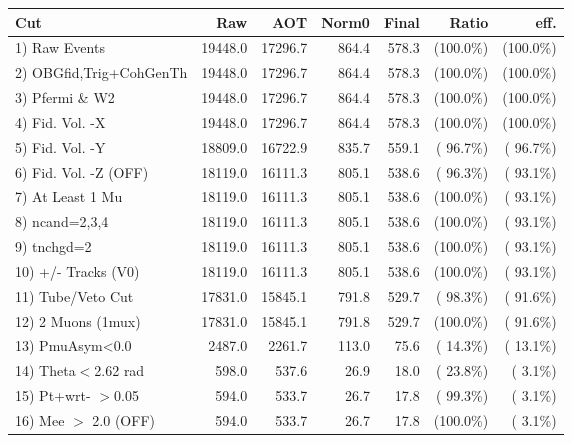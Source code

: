  \begin{table}[h!]\centering
 \begin{tabular}{||l||r|r|r|r|r|r||}
 \hline
 \hline
 Cut & Raw & AOT & Norm0 & Final & Ratio & eff.       \\
 \hline
  1) Raw Events           &      19448.0 &      17296.7 &        864.4 &        578.3 & (100.0\%) & (100.0\%) \\
  2) OBGfid,Trig+CohGenTh &      19448.0 &      17296.7 &        864.4 &        578.3 & (100.0\%) & (100.0\%) \\
  3) Pfermi \& W2         &      19448.0 &      17296.7 &        864.4 &        578.3 & (100.0\%) & (100.0\%) \\
  4) Fid. Vol. -X         &      19448.0 &      17296.7 &        864.4 &        578.3 & (100.0\%) & (100.0\%) \\
  5) Fid. Vol. -Y         &      18809.0 &      16722.9 &        835.7 &        559.1 & ( 96.7\%) & ( 96.7\%) \\
  6) Fid. Vol. -Z (OFF)   &      18119.0 &      16111.3 &        805.1 &        538.6 & ( 96.3\%) & ( 93.1\%) \\
  7) At Least 1 Mu        &      18119.0 &      16111.3 &        805.1 &        538.6 & (100.0\%) & ( 93.1\%) \\
  8) ncand=2,3,4          &      18119.0 &      16111.3 &        805.1 &        538.6 & (100.0\%) & ( 93.1\%) \\
  9) tnchgd=2             &      18119.0 &      16111.3 &        805.1 &        538.6 & (100.0\%) & ( 93.1\%) \\
 10) +/- Tracks (V0)      &      18119.0 &      16111.3 &        805.1 &        538.6 & (100.0\%) & ( 93.1\%) \\
 11) Tube/Veto Cut        &      17831.0 &      15845.1 &        791.8 &        529.7 & ( 98.3\%) & ( 91.6\%) \\
 12) 2 Muons (1mux)       &      17831.0 &      15845.1 &        791.8 &        529.7 & (100.0\%) & ( 91.6\%) \\
 13) PmuAsym<0.0          &       2487.0 &       2261.7 &        113.0 &         75.6 & ( 14.3\%) & ( 13.1\%) \\
 14) Theta$<$2.62 rad     &        598.0 &        537.6 &         26.9 &         18.0 & ( 23.8\%) & (  3.1\%) \\
 15) Pt+wrt- $>$0.05      &        594.0 &        533.7 &         26.7 &         17.8 & ( 99.3\%) & (  3.1\%) \\
 16) Mee $>$ 2.0  (OFF)   &        594.0 &        533.7 &         26.7 &         17.8 & (100.0\%) & (  3.1\%) \\

\end{tabular}
\end{table}
